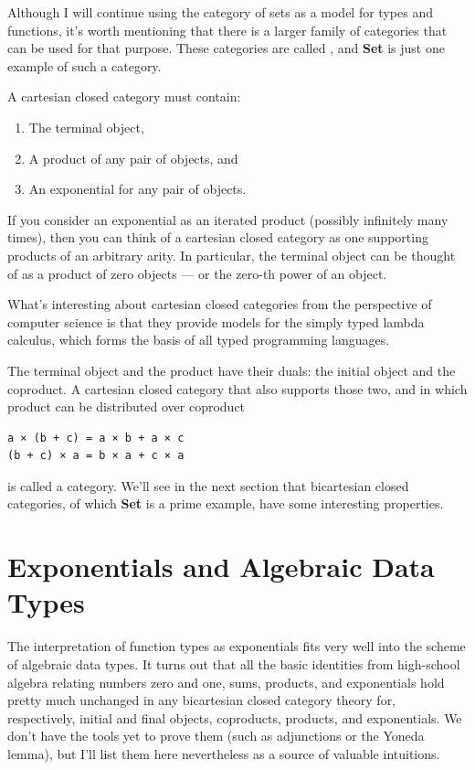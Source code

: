 Although I will continue using the category of sets as a model for types
and functions, it's worth mentioning that there is a larger family of
categories that can be used for that purpose. These categories are
called , and \textbf{Set} is just one example of
such a category.

A cartesian closed category must contain:

\begin{enumerate}
\tightlist
\item
  The terminal object,
\item
  A product of any pair of objects, and
\item
  An exponential for any pair of objects.
\end{enumerate}
If you consider an exponential as an iterated product (possibly
infinitely many times), then you can think of a cartesian closed
category as one supporting products of an arbitrary arity. In
particular, the terminal object can be thought of as a product of zero
objects --- or the zero-th power of an object.

What's interesting about cartesian closed categories from the
perspective of computer science is that they provide models for the
simply typed lambda calculus, which forms the basis of all typed
programming languages.

The terminal object and the product have their duals: the initial object
and the coproduct. A cartesian closed category that also supports those
two, and in which product can be distributed over coproduct

\begin{verbatim}
a × (b + c) = a × b + a × c
(b + c) × a = b × a + c × a
\end{verbatim}
is called a  category. We'll see in the next
section that bicartesian closed categories, of which \textbf{Set} is a
prime example, have some interesting properties.

\section{Exponentials and Algebraic Data
Types}\label{exponentials-and-algebraic-data-types}

The interpretation of function types as exponentials fits very well into
the scheme of algebraic data types. It turns out that all the basic
identities from high-school algebra relating numbers zero and one, sums,
products, and exponentials hold pretty much unchanged in any bicartesian
closed category theory for, respectively, initial and final objects,
coproducts, products, and exponentials. We don't have the tools yet to
prove them (such as adjunctions or the Yoneda lemma), but I'll list them
here nevertheless as a source of valuable intuitions.


